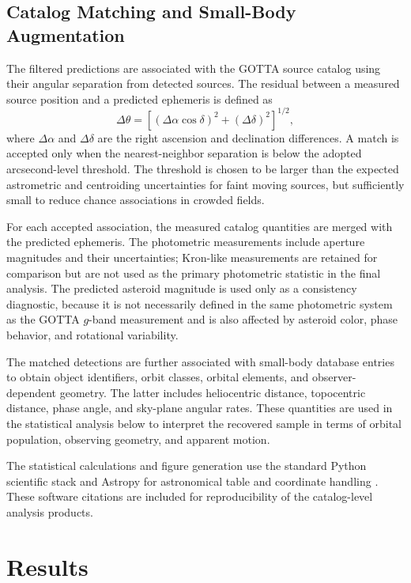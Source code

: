 \documentclass[referee]{raa}
\begin{document}
\subsection{Catalog Matching and Small-Body Augmentation}

The filtered predictions are associated with the GOTTA source catalog using their angular separation from detected sources. The residual between a measured source position and a predicted ephemeris is defined as
\begin{equation}
\Delta\theta =
\left[
(\Delta\alpha\cos\delta)^2 + (\Delta\delta)^2
\right]^{1/2},
\end{equation}
where $\Delta\alpha$ and $\Delta\delta$ are the right ascension and declination differences. A match is accepted only when the nearest-neighbor separation is below the adopted arcsecond-level threshold. The threshold is chosen to be larger than the expected astrometric and centroiding uncertainties for faint moving sources, but sufficiently small to reduce chance associations in crowded fields.

For each accepted association, the measured catalog quantities are merged with the predicted ephemeris. The photometric measurements include aperture magnitudes and their uncertainties; Kron-like measurements are retained for comparison but are not used as the primary photometric statistic in the final analysis. The predicted asteroid magnitude is used only as a consistency diagnostic, because it is not necessarily defined in the same photometric system as the GOTTA $g$-band measurement and is also affected by asteroid color, phase behavior, and rotational variability.

The matched detections are further associated with small-body database entries to obtain object identifiers, orbit classes, orbital elements, and observer-dependent geometry. The latter includes heliocentric distance, topocentric distance, phase angle, and sky-plane angular rates. These quantities are used in the statistical analysis below to interpret the recovered sample in terms of orbital population, observing geometry, and apparent motion.

The statistical calculations and figure generation use the standard Python scientific stack and Astropy for astronomical table and coordinate handling \citep{Astropy2013,Astropy2018,Astropy2022}. These software citations are included for reproducibility of the catalog-level analysis products.

\section{Results}
\label{sec:results}
\end{document}
